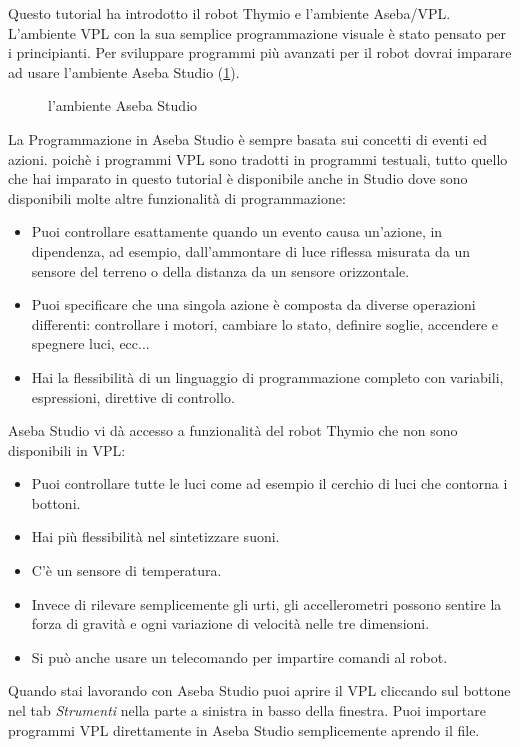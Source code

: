 
\label{ch.next}

Questo tutorial ha introdotto il robot Thymio e l'ambiente Aseba/VPL. L'ambiente VPL con la sua semplice programmazione visuale è stato pensato per i principianti. Per sviluppare programmi più avanzati per il robot dovrai imparare ad usare l'ambiente Aseba Studio (\cref{fig.studio}).

\begin{figure}[hbt]
\begin{center}
\caption{l'ambiente Aseba Studio}\label{fig.studio}
\end{center}
\end{figure}

La Programmazione in Aseba Studio è sempre basata sui concetti di eventi ed azioni.
poichè i programmi VPL sono tradotti in programmi testuali,
tutto quello che hai imparato in questo tutorial è disponibile anche in Studio
dove sono disponibili  molte altre funzionalità di programmazione:
\begin{itemize}
\item Puoi controllare esattamente quando un evento causa un'azione, in dipendenza, ad esempio, dall'ammontare di luce riflessa misurata da un sensore del terreno o della distanza da un sensore orizzontale.
\item Puoi specificare che una singola azione è composta da diverse operazioni differenti: 
controllare i motori, cambiare lo stato, definire soglie, accendere e spegnere luci, ecc...
\item Hai la flessibilità  di un linguaggio di programmazione completo con variabili, espressioni, direttive di controllo.
\end{itemize}

Aseba Studio vi dà accesso a funzionalità del robot Thymio che non sono disponibili in VPL:

\begin{itemize}
\item Puoi controllare tutte le luci come ad esempio il cerchio di luci che contorna i bottoni.
\item Hai più flessibilità nel sintetizzare suoni.
\item C'è un sensore di temperatura.
\item Invece di rilevare semplicemente gli urti, gli accellerometri possono sentire la forza di gravità e ogni
variazione di velocità nelle tre dimensioni.
\item Si può anche usare un telecomando per impartire comandi al robot.
\end{itemize}
Quando stai lavorando con Aseba Studio puoi aprire il VPL cliccando sul bottone  nel tab \emph{Strumenti} nella parte a sinistra in basso della finestra.
Puoi importare programmi VPL direttamente in Aseba Studio semplicemente aprendo il file.

